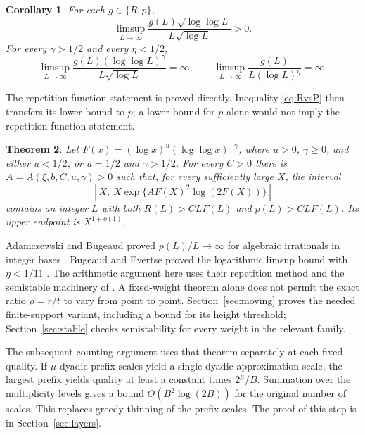 \documentclass[11pt]{article}
\numberwithin{equation}{section}
\newtheorem{theorem}{Theorem}[section]
\newtheorem{corollary}[theorem]{Corollary}
\theoremstyle{remark}\newtheorem{remark}[theorem]{Remark}
\begin{document}
\begin{corollary}\label{cor:limsup}
For each $g\in\{R,p\}$,
\[
 \limsup_{L\to\infty}
 \frac{g(L)\sqrt{\log\log L}}{L\sqrt{\log L}}>0.
\]
For every $\gamma>1/2$ and every $\eta<1/2$,
\begin{equation}\label{eq:weightedlimsup}
 \limsup_{L\to\infty}
 \frac{g(L)(\log\log L)^\gamma}{L\sqrt{\log L}}=\infty,
 \qquad
 \limsup_{L\to\infty}\frac{g(L)}{L(\log L)^\eta}=\infty.
\end{equation}
\end{corollary}

The repetition-function statement is proved directly. Inequality
\eqref{eq:RvsP} then transfers its lower bound to $p$; a lower bound
for $p$ alone would not imply the repetition-function statement.

\begin{theorem}\label{thm:nearwindow}
Let $F(x)=(\log x)^u(\log\log x)^{-\gamma}$, where $u>0$, $\gamma\ge0$,
and either $u<1/2$, or $u=1/2$ and $\gamma>1/2$.
For every $C>0$ there is $A=A(\xi,b,C,u,\gamma)>0$ such that, for every
sufficiently large $X$, the interval
\begin{equation}\label{eq:nearwindow}
 \left[X,\ X\exp\{A F(X)^2\log(2F(X))\}\right]
\end{equation}
contains an integer $L$ with both $R(L)>CLF(L)$ and $p(L)>CLF(L)$.
Its upper endpoint is $X^{1+o(1)}$.
\end{theorem}

Adamczewski and Bugeaud proved $p(L)/L\to\infty$ for algebraic
irrationals in integer bases \cite{AB07}. Bugeaud and Evertse proved
the logarithmic limsup bound with $\eta<1/11$
\cite[Theorem~2.1]{BE08}. The arithmetic argument here uses their
repetition method and the semistable machinery of
\cite[Sections~8--14]{EF13}. A fixed-weight theorem alone does not
permit the exact ratio $\rho=r/t$ to vary from point to point.
Section~\ref{sec:moving} proves the needed finite-support variant,
including a bound for its height threshold; Section~\ref{sec:stable}
checks semistability for every weight in the relevant family.

The subsequent counting argument uses that theorem separately at each
fixed quality. If $\mu$ dyadic prefix scales yield a single dyadic
approximation scale, the largest prefix yields quality at least a
constant times $2^\mu/B$. Summation over the multiplicity levels gives
a bound $O(B^2\log(2B))$ for the original number of scales.
This replaces greedy thinning of the prefix scales.
The proof of this step is in Section~\ref{sec:layers}.
\end{document}
